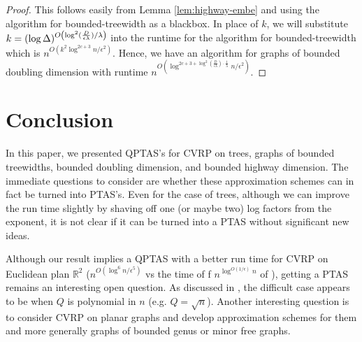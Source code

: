 \documentclass[twoside,leqno]{article}
\newcommand{\eps}{\epsilon}
\DeclarePairedDelimiter\autobracket{(}{)}
\newcommand{\br}[1]{\autobracket*{#1}}
\begin{document}
\begin{proof}
This follows easily from Lemma \ref{lem:highway-embe} and using the algorithm for bounded-treewidth as a blackbox. In place of $k$, we will substitute $k = (\log \Delta)^{O\br{\log^2(\frac{D}{\eps \lambda})/\lambda}}$ into the runtime for the algorithm for bounded-treewidth which is $n^{O(k^2 \log^{2c + 3}n/\eps^2)}$. Hence, we have an algorithm for graphs of bounded doubling dimension with runtime $n^{O( \log^{2c + 3 + \log^2(\frac{D}{\eps \lambda})\cdot \frac{1}{\lambda}}n/\eps^2)}$. 
\end{proof}

\section{Conclusion}
In this paper, we presented QPTAS's for CVRP on trees, graphs of bounded treewidths, bounded doubling dimension, and bounded highway dimension. The immediate questions to consider are whether these approximation schemes can in fact be turned into PTAS's. Even for the case of trees, although we can improve the run time slightly by shaving off one (or maybe two) log factors from the exponent, it is not clear if it can be turned into a PTAS without significant new ideas. 

Although our result implies a QPTAS with a better run time
for CVRP on Euclidean plan $\mathbb{R}^2$ ($n^{O(\log^{6}n/\eps^{5})}$ vs the time of
f $n^{\log^{O(1/\epsilon)}n}$ of \cite{Das-Mathieu}), getting a PTAS remains an interesting open question.
As discussed in \cite{AdamaszekCL09}, the difficult case appears to be when $Q$ is polynomial in $n$ (e.g. $Q=\sqrt{n}$). Another interesting question is to consider CVRP on planar graphs and develop approximation schemes for them and more generally graphs of bounded genus or minor free graphs.


\end{document}
